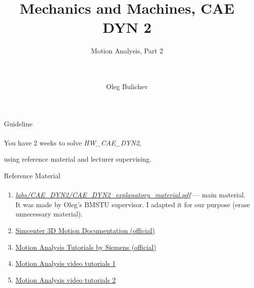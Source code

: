 \documentclass[aspectratio=169]{beamer}
\title[MaM]{Mechanics and Machines, CAE DYN 2} %
\subtitle{Motion Analysis, Part 2
\\ \  \\ \ 
    } %
\author{Oleg Bulichev}
\newcommand{\fbckg}[1]{\usebackgroundtemplate{\texttt{[image: \#1]}}}%
\begin{document}
\setlength{\abovedisplayskip}{0pt}
\setlength{\belowdisplayskip}{0pt}
\setlength{\abovedisplayshortskip}{0pt}
\setlength{\belowdisplayshortskip}{0pt}

\fbckg{fibeamer/figs/title_page.png}

\fbckg{fibeamer/figs/common.png}

\note{\scriptsize
\ 
}

\begin{frame}[c]{Guideline}
\framesubtitle{}
    \centering \LARGE You have 2 weeks to solve \textit{HW\_CAE\_DYN2},
    
    using reference material and lecturer supervising.
\end{frame}

\begin{frame}[t]{Reference Material}
\framesubtitle{}
\begin{enumerate}
    \item \href{https://github.com/Lupasic/MaM_Inno_2023/tree/main/labs/CAE_DYN2/CAE_DYN2_explanatory_material.pdf}{\textit{labs/CAE\_DYN2/CAE\_DYN2\_explanatory\_material.pdf}} --- main material. It was made by Oleg's BMSTU supervisor. I adapted it for our purpose (erase unnecessary material).
    \item \href{https://docs.sw.siemens.com/en-US/doc/289054037/PL20201105153211099.motion/id563946}{Simcenter 3D Motion Documentation (official)}
    \item \href{https://docs.sw.siemens.com/en-US/doc/289054037/PL20201105153211099.xid1391716/xid1964458}{Motion Analysis Tutorials by Siemens (official)}
    \item \href{https://www.youtube.com/playlist?list=PLY8N5WFx1MGAsxH7G49ey37QC\_nFtQ72E}{Motion Analysis video tutorials 1}
    \item \href{https://www.youtube.com/playlist?list=PL0B-6-amsUZCDepzFMcGETf9pb9CSiqTL}{Motion Analysis video tutorials 2}
\end{enumerate}
\end{frame}

\fbckg{fibeamer/figs/last_page.png}
\frame[plain]{}
\end{document}
